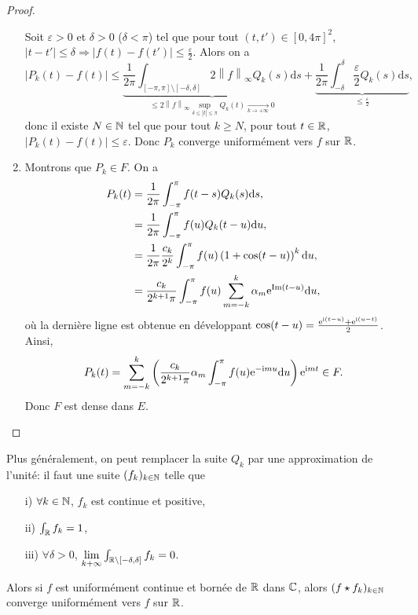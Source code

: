 \begin{proof}
\begin{enumerate}
        Soit $\varepsilon>0$ et $\delta>0$ ($\delta<\pi$) tel que pour tout $(t,t')\in[0,4\pi]^{2}$, $\left\lvert t-t'\right\rvert\leqslant\delta\Rightarrow\left\lvert f(t)-f(t')\right\rvert\leqslant\frac{\varepsilon}{2}$. Alors on a 
        \begin{equation}
            \left\lvert P_{k}(t)-f(t)\right\rvert\leqslant\underbrace{\frac{1}{2\pi}\int_{[-\pi,\pi]\setminus[-\delta,\delta]}2\left\lVert f\right\rVert_{\infty}Q_{k}(s)\mathrm{d}s}_{\leqslant2\left\lVert f\right\rVert_{\infty}\sup\limits_{\delta\leqslant\left\lvert t\right\rvert \leqslant\pi}Q_{k}(t)\xrightarrow[k\to+\infty]{}0}+\underbrace{\frac{1}{2\pi}\int_{-\delta}^{\delta}\frac{\varepsilon}{2}Q_{k}(s)\mathrm{d}s}_{\leqslant\frac{\varepsilon}{2}},
        \end{equation}
        donc il existe $N\in\mathbb{N}$ tel que pour tout $k\geqslant N$, pour tout $t\in\mathbb{R}$, $\left\lvert P_{k}(t)-f(t)\right\rvert\leqslant\varepsilon$. Donc $P_{k}$ converge uniformément vers $f$ sur $\mathbb{R}$.

        \item Montrons que $P_{k}\in F$. On a 
        \begin{align}
            P_{k}(t)
            &=\frac{1}{2\pi}\int_{-\pi}^{\pi}f(t-s)Q_{k}(s)\mathrm{d}s,\\
            &=\frac{1}{2\pi}\int_{-\pi}^{\pi}f(u)Q_{k}(t-u)\mathrm{d}u,\\
            &=\frac{1}{2\pi}\frac{c_{k}}{2^{k}}\int_{-\pi}^{\pi}f(u)\left(1+\cos(t-u)\right)^{k}\mathrm{d}u,\\
            &=\frac{c_{k}}{2^{k+1}\pi}\int_{-\pi}^{\pi}f(u)\sum_{m=-k}^{k}\alpha_{m}\mathrm{e}^{\mathrm{Im}(t-u)}\mathrm{d}u,
        \end{align}
        où la dernière ligne est obtenue en développant $\cos(t-u)=\frac{\mathrm{e}^{\mathrm{i}(t-u)}+\mathrm{e}^{\mathrm{i}(u-t)}}{2}$.
        Ainsi, 
        \begin{equation}
            P_{k}(t)=\sum_{m=-k}^{k}\left(\frac{c_{k}}{2^{k+1}\pi}\alpha_{m}\int_{-\pi}^{\pi}f(u)\mathrm{e}^{-\mathrm{i} mu}\mathrm{d}u\right)\mathrm{e}^{\mathrm{i} mt}\in F.
        \end{equation}
        Donc $F$ est dense dans $E$.
    \end{enumerate}
\end{proof}

\begin{remark}
    Plus généralement, on peut remplacer la suite $Q_{k}$ par une \og approximation de l'unité\fg : il faut une suite $(f_{k})_{k\in\mathbb{N}}$ telle que
    \begin{enumerate}
        \item [i)] $\forall k\in\mathbb{N}$, $f_{k}$ est continue et positive,
        \item [ii)] $\int_{\mathbb{R}}f_{k}=1$,
        \item [iii)] $\forall\delta >0$, $\lim\limits_{k+\infty}\int_{\mathbb{R}\setminus[-\delta,\delta]}f_{k}=0$.
    \end{enumerate}
    Alors si $f$ est uniformément continue et bornée de $\mathbb{R}$ dans $\mathbb{C}$, alors $(f\star f_{k})_{k\in\mathbb{N}}$ converge uniformément vers $f$ sur $\mathbb{R}$.
\end{remark}

